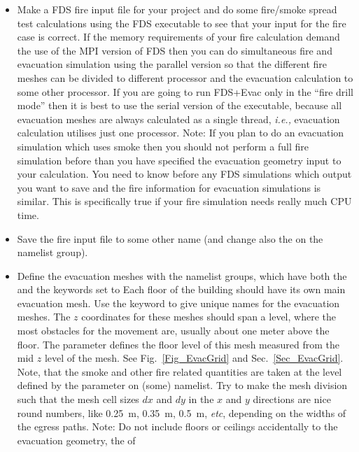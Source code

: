 \documentclass[12pt,a4paper,final,twoside]{stylevk}
\begin{document}
\begin{itemize}
%
\item Make a FDS fire input file for your project and do some
  fire/smoke spread test calculations using the FDS executable to see
  that your input for the fire case is correct.  If the memory
  requirements of your fire calculation demand the use of the MPI
  version of FDS then you can do simultaneous fire and evacuation
  simulation using the parallel version so that the different fire
  meshes can be divided to different processor and the evacuation
  calculation to some other processor.  If you are going to run
  FDS+Evac only in the ``fire drill mode'' then it is best to use the
  serial version of the executable, because all evacuation meshes are
  always calculated as a single thread, \emph{i.e.,} evacuation
  calculation utilises just one processor.  Note: If you plan to do an
  evacuation simulation which uses smoke then you should not perform a
  full fire simulation before than you have specified the evacuation
  geometry input to your calculation.  You need to know before any FDS
  simulations which output you want to save and the fire information
  for evacuation simulations is similar.  This is specifically true if
  your fire simulation needs really much CPU time.
%
\item Save the fire input file to some other name (and change also the
   on the  namelist group).
%
\item Define the evacuation meshes with the  namelist
  groups, which have both the  and the
   keywords set to   Each floor of the
  building should have its own main evacuation mesh.  Use the
   keyword to give unique names for the evacuation meshes.
  The $z$ coordinates for these meshes should span a level, where the
  most obstacles for the movement are, usually about one meter above
  the floor.  The  parameter defines the floor
  level of this mesh measured from the mid $z$ level of the mesh.  See
  Fig.~\ref{Fig_EvacGrid} and Sec.~\ref{Sec_EvacGrid}.  Note, that the
  smoke and other fire related quantities are taken at the level
  defined by the  parameter on (some)
   namelist.  Try to make the mesh division such that the
  mesh cell sizes $dx$ and $dy$ in the $x$ and $y$ directions are nice
  round numbers, like 0.25~m, 0.35~m, 0.5~m, \emph{etc}, depending on
  the widths of the egress paths.  Note: Do not include floors or
  ceilings accidentally to the evacuation geometry, the  of

\end{itemize}
\end{document}
